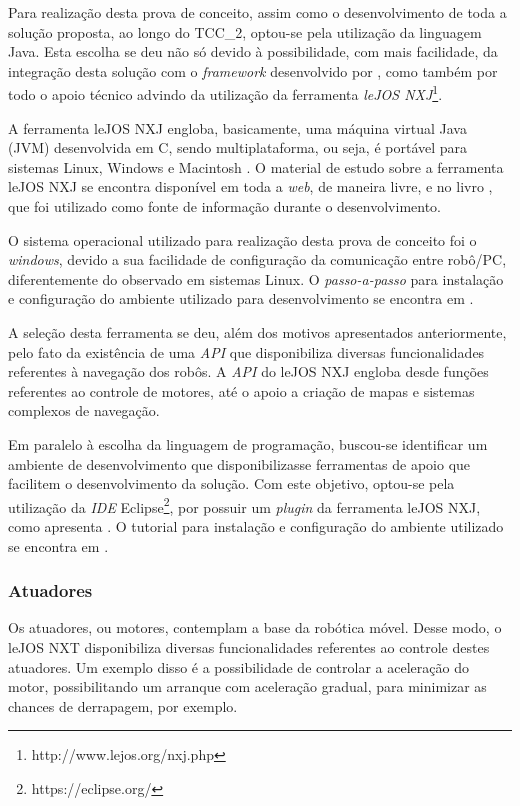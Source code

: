 		Para realização desta prova de conceito, assim como o desenvolvimento de toda a solução proposta, ao longo do TCC\_2, optou-se pela utilização da linguagem Java. Esta escolha se deu não só devido à possibilidade, com mais facilidade, da integração desta solução com o \textit{framework} desenvolvido por \cite{tccRodrigo}, como também por todo o apoio técnico advindo da utilização da ferramenta \textit{leJOS NXJ}\footnote{http://www.lejos.org/nxj.php}.

		A ferramenta leJOS NXJ engloba, basicamente, uma máquina virtual Java (JVM) desenvolvida em C, sendo multiplataforma, ou seja, é portável para sistemas Linux, Windows e Macintosh \cite{legonxj}. O material de estudo sobre a ferramenta leJOS NXJ se encontra disponível em toda a \textit{web}, de maneira livre, e no livro \cite{legonxj}, que foi utilizado como fonte de informação durante o desenvolvimento.	

		O sistema operacional utilizado para realização desta prova de conceito foi o \textit{windows}, devido a sua facilidade de configuração da comunicação entre robô/PC, diferentemente do observado em sistemas Linux. O \textit{passo-a-passo} para instalação e configuração do ambiente utilizado para desenvolvimento se encontra em \cite[p. 6]{legonxj}.

		A seleção desta ferramenta se deu, além dos motivos apresentados anteriormente, pelo fato da existência de uma \textit{API} que disponibiliza diversas funcionalidades referentes à navegação dos robôs. A \textit{API} do leJOS NXJ engloba desde funções referentes ao controle de motores, até o apoio a criação de mapas e sistemas complexos de navegação.

		Em paralelo à escolha da linguagem de programação, buscou-se identificar um ambiente de desenvolvimento que disponibilizasse ferramentas de apoio que facilitem o desenvolvimento da solução. Com este objetivo, optou-se pela utilização da \textit{IDE} Eclipse\footnote{https://eclipse.org/}, por possuir um \textit{plugin} da ferramenta leJOS NXJ, como apresenta \cite{legonxj}. O tutorial para instalação e configuração do ambiente utilizado se encontra em \cite[p. 14]{legonxj}.

	\subsubsection{Atuadores}

		Os atuadores, ou motores, contemplam a base da robótica móvel. Desse modo, o leJOS NXT disponibiliza diversas funcionalidades referentes ao controle destes atuadores. Um exemplo disso é a possibilidade de controlar a aceleração do motor, possibilitando um arranque com aceleração gradual, para minimizar as chances de derrapagem, por exemplo.

